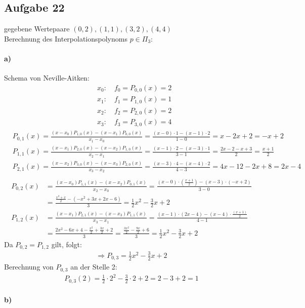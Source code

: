 \subsection*{Aufgabe 22}
gegebene Wertepaare $(0,2), (1,1), (3,2), (4,4)$\\
Berechnung des Interpolationspolynoms $p\in \Pi_3$:

\paragraph*{a)}
Schema von Neville-Aitken:\\
\begin{align*}
&x_0: \quad f_0=P_{0,0}(x)=2\\
&x_1: \quad f_1=P_{1,0}(x)=1\\
&x_2: \quad f_2=P_{2,0}(x)=2\\
&x_3: \quad f_3=P_{3,0}(x)=4
\end{align*}
\begin{align*}
&P_{0,1}(x)=\frac{(x-x_0)P_{1,0}(x)-(x-x_1)P_{0,0}(x)}{x_1-x_0}=\frac{(x-0)\cdot 1 -(x-1)\cdot2}{1-0}= x-2x+2=-x+2\\
&P_{1,1}(x)=\frac{(x-x_1)P_{2,0}(x)-(x-x_2)P_{1,0}(x)}{x_2-x_1}=\frac{(x-1)\cdot 2 -(x-3)\cdot 1}{3-1}= \frac{2x-2-x+3}{2}=\frac{x+1}{2}\\
&P_{2,1}(x)=\frac{(x-x_2)P_{3,0}(x)-(x-x_3)P_{2,0}(x)}{x_3-x_2}=\frac{(x-3)\cdot 4 -(x-4)\cdot 2}{4-3}= 4x-12-2x+8=2x-4\\
\end{align*}
\begin{align*}
P_{0,2}(x)&=\frac{(x-x_0)P_{1,1}(x)-(x-x_2)P_{0,1}(x)}{x_2-x_0}=\frac{(x-0)\cdot (\frac{x+1}{2}) -(x-3) \cdot(-x+2)}{3-0}\\ &=\frac{\frac{x^2+x}{2}-(-x^2+3x+2x-6)}{3}=\frac{1}{2}x^2-\frac{3}{2}x+2\\
P_{1,2}(x)&=\frac{(x-x_1)P_{2,1}(x)-(x-x_3)P_{1,1}(x)}{x_3-x_1}=\frac{(x-1)\cdot (2x-4) -(x-4) \cdot\frac{(x+1)}{2}}{4-1}\\ &=\frac{2x^2-6x+4-\frac{x^2}{2}+\frac{3x}{2}+2}{3}=\frac{\frac{3x^2}{2}-\frac{9x}{2}+6}{3}=\frac{1}{2}x^2-\frac{3}{2}x+2
\end{align*}
Da $P_{0,2}=P_{1,2}$ gilt, folgt:
\begin{align*}
\Rightarrow P_{0,3}=\frac{1}{2}x^2-\frac{3}{2}x+2
\end{align*}
Berechnung von $P_{0,3}$ an der Stelle 2:
\begin{align*}
P_{0,3}(2)=\frac{1}{2}\cdot 2^2-\frac{3}{2}\cdot 2+2=2-3+2=1
\end{align*}
\paragraph*{b)}


